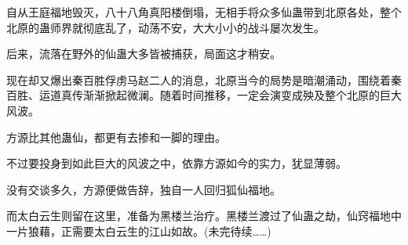 \begin{this_body}
自从王庭福地毁灭，八十八角真阳楼倒塌，无相手将众多仙蛊带到北原各处，整个北原的蛊师界就彻底乱了，动荡不安，大大小小的战斗屡次发生。

后来，流落在野外的仙蛊大多皆被捕获，局面这才稍安。

现在却又爆出秦百胜俘虏马赵二人的消息，北原当今的局势是暗潮涌动，围绕着秦百胜、运道真传渐渐掀起微澜。随着时间推移，一定会演变成殃及整个北原的巨大风波。

方源比其他蛊仙，都更有去掺和一脚的理由。

不过要投身到如此巨大的风波之中，依靠方源如今的实力，犹显薄弱。

没有交谈多久，方源便做告辞，独自一人回归狐仙福地。

而太白云生则留在这里，准备为黑楼兰治疗。黑楼兰渡过了仙蛊之劫，仙窍福地中一片狼藉，正需要太白云生的江山如故。(未完待续……)

\end{this_body}

